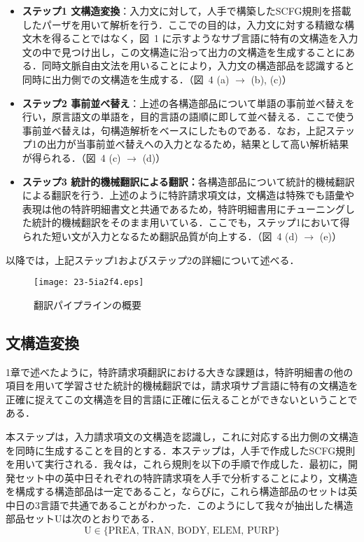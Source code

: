\documentclass[japanese]{jnlp_1.4}
\begin{document}
\begin{itemize}
\item \textbf{ステップ1 文構造変換}：入力文に対して，人手で構築したSCFG規則を搭載したパーザを用いて解析を行う．ここでの目的は，入力文に対する精緻な構文木を得ることではなく，図~1 に示すようなサブ言語に特有の文構造を入力文の中で見つけ出し，この文構造に沿って出力の文構造を生成することにある．同時文脈自由文法を用いることにより，入力文の構造部品を認識すると同時に出力側での文構造を生成する．（図~4 (a) $\to $ (b), (c)）
\item \textbf{ステップ2 事前並べ替え}：上述の各構造部品について単語の事前並べ替えを行い，原言語文の単語を，目的言語の語順に即して並べ替える．ここで使う事前並べ替えは，句構造解析をベースにしたものである．なお，上記ステップ1の出力が当事前並べ替えへの入力となるため，結果として高い解析結果が得られる．（図~4 (c) $\to $ (d)）
\item \textbf{ステップ3 統計的機械翻訳による翻訳：}各構造部品について統計的機械翻訳による翻訳を行う．上述のように特許請求項文は，文構造は特殊でも語彙や表現は他の特許明細書文と共通であるため，特許明細書用にチューニングした統計的機械翻訳をそのまま用いている．ここでも，ステップ1において得られた短い文が入力となるため翻訳品質が向上する．（図~4 (d) $\to $ (e)）
\end{itemize}

以降では，上記ステップ1およびステップ2の詳細について述べる．

\begin{figure}[t]
\begin{center}
\texttt{[image: 23-5ia2f4.eps]}
\end{center}
\caption{翻訳パイプラインの概要}
\label{fig04}
\end{figure}


\subsection{文構造変換}

1章で述べたように，特許請求項翻訳における大きな課題は，特許明細書の他の項目を用いて学習させた統計的機械翻訳では，請求項サブ言語に特有の文構造を正確に捉えてこの文構造を目的言語に正確に伝えることができないということである．

本ステップは，入力請求項文の文構造を認識し，これに対応する出力側の文構造を同時に生成することを目的とする．本ステップは，人手で作成したSCFG規則を用いて実行される．我々は，これら規則を以下の手順で作成した．最初に，開発セット中の英中日それぞれの特許請求項を人手で分析することにより，文構造を構成する構造部品は一定であること，ならびに，これら構造部品のセットは英中日の3言語で共通であることがわかった．このようにして我々が抽出した構造部品セットUは次のとおりである．
\[
\mathrm{U} \in  \{\text{PREA,\ TRAN,\ BODY,\ ELEM,\ PURP}\}
\]
\end{document}
